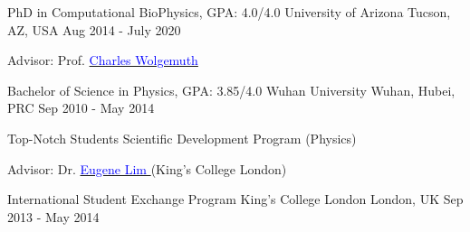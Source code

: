 
\begin{cventries}
  \cventry
    {PhD in Computational BioPhysics, GPA: 4.0/4.0} %
    {University of Arizona} %
    {Tucson, AZ, USA} %
    {Aug 2014 - July 2020} %
    {  \begin{cvitems} %
         \item {Advisor: Prof. \href{http://www.physics.arizona.edu/~wolg}{\textcolor{blue}{Charles Wolgemuth} } }
      \end{cvitems}
    }

  \cventry
    {Bachelor of Science in Physics, GPA: 3.85/4.0} %
    {Wuhan University} %
    {Wuhan, Hubei, PRC} %
    {Sep 2010 - May 2014} %
    {  \begin{cvitems} %
         \item {Top-Notch Students Scientific Development Program (Physics)}
         \item {Advisor: Dr. \href{https://www.kcl.ac.uk/people/eugene-lim}{\textcolor{blue}{Eugene Lim} }(King's College London) }
      \end{cvitems}
    }
   
  \cventry
    {International Student Exchange Program} %
    {King's College London} %
    {London, UK} %
    {Sep 2013 - May 2014} %
    {}    
\end{cventries}

